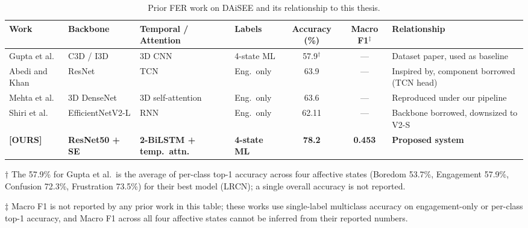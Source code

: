 \begin{table}[H]
\centering
\footnotesize
\caption{Prior \ac{FER} work on \ac{DAiSEE} and its relationship to this thesis.}
\label{tab:fer_lit_compare}
\setlength{\tabcolsep}{4pt}
\begin{threeparttable}
\begin{tabular}{p{3.0cm} p{2.2cm} p{2.4cm} p{1.4cm} c c p{2.6cm}}
\toprule
\textbf{Work} & \textbf{Backbone} & \textbf{Temporal / Attention} &
\textbf{Labels} & \textbf{Accuracy (\%)} & \textbf{Macro F1}$^{\ddagger}$ &
\textbf{Relationship} \\
\midrule
Gupta et al.\ \cite{gupta_daisee_2016}            & C3D / I3D         & 3D \ac{CNN}              & 4-state ML  & 57.9$^{\dagger}$ & ---   & Dataset paper, used as baseline \\
Abedi and Khan \cite{abedi_improving_2021}        & ResNet            & \ac{TCN}                 & Eng.\ only  & 63.9             & ---   & Inspired by, component borrowed (\ac{TCN} head) \\
Mehta et al.\ \cite{mehta_three-dimensional_2022} & 3D DenseNet       & 3D self-attention   & Eng.\ only  & 63.6             & ---   & Reproduced under our pipeline \\
Shiri et al.\ \cite{shiri_detection_2024}         & EfficientNetV2-L  & RNN                 & Eng.\ only  & 62.11            & ---   & Backbone borrowed, downsized to V2-S \\
\midrule
\textbf{[OURS]} & \textbf{ResNet50 + \ac{SE}} & \textbf{2-\ac{BiLSTM} + temp.\ attn.} & \textbf{4-state ML} & \textbf{78.2} & \textbf{0.453} & \textbf{Proposed system} \\
\bottomrule
\end{tabular}
\begin{tablenotes}
\footnotesize
\item[$\dagger$] The 57.9\% for Gupta et al.\ is the average of per-class top-1 accuracy across four affective states (Boredom 53.7\%, Engagement 57.9\%, Confusion 72.3\%, Frustration 73.5\%) for their best model (LRCN); a single overall accuracy is not reported.
\item[$\ddagger$] Macro F1 is not reported by any prior work in this table; these works use single-label multiclass accuracy on engagement-only or per-class top-1 accuracy, and Macro F1 across all four affective states cannot be inferred from their reported numbers.
\end{tablenotes}
\end{threeparttable}
\end{table}

